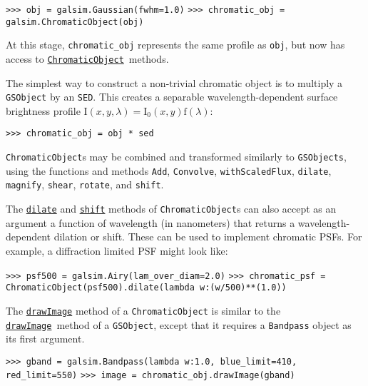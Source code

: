 \documentclass[preprint,10pt]{../../devel/modules/aastex}
\newcommand\ChromaticObject{\href{http://galsim-developers.github.io/GalSim/classgalsim_1_1chromatic_1_1_chromatic_object.html}{\texttt{ChromaticObject}}}
\newcommand\drawImage{\href{http://galsim-developers.github.io/GalSim/classgalsim_1_1base_1_1_g_s_object.html\#aafe6ca9d84fe81543fbc105b897273db}{\texttt{drawImage}}}
\begin{document}
\texttt{>>> obj = galsim.Gaussian(fwhm=1.0)}\newline
\texttt{>>> chromatic\_obj = galsim.ChromaticObject(obj)}

At this stage, \texttt{chromatic\_obj} represents the same profile as \texttt{obj}, but
now has access to \ChromaticObject\ methods.

The simplest way to construct a non-trivial chromatic object is to multiply a \texttt{GSObject} by
an \texttt{SED}.  This creates a separable wavelength-dependent surface brightness profile
$\mathrm{I}(x, y, \lambda) = \mathrm{I}_0(x, y) \mathrm{f}(\lambda)$:

\texttt{>>> chromatic\_obj = obj * sed}

\texttt{ChromaticObject}s may be combined and transformed similarly to
\texttt{GSObjects}, using the functions and methods \texttt{Add}, \texttt{Convolve}, \texttt{withScaledFlux}, \texttt{dilate}, \texttt{magnify}, \texttt{shear}, \texttt{rotate}, and \texttt{shift}.

The \href{http://galsim-developers.github.io/GalSim/classgalsim_1_1chromatic_1_1_chromatic_object.html#adb05a4f0dadc3c7cbc361ec97984e6f1}{\texttt{dilate}} and \href{http://galsim-developers.github.io/GalSim/classgalsim_1_1chromatic_1_1_chromatic_object.html#ab266ee1207d60ba7a9fb6b32a4ef6ab2}{\texttt{shift}} methods of
\texttt{ChromaticObject}s can also accept as an argument a function of wavelength (in nanometers)
that returns a wavelength-dependent dilation or shift.  These can be used to implement
chromatic PSFs.  For example, a diffraction limited PSF might look
like:

\texttt{>>> psf500 = galsim.Airy(lam\_over\_diam=2.0)}\newline
\texttt{>>> chromatic\_psf = ChromaticObject(psf500).dilate(lambda w:(w/500)**(1.0))}

The \href{http://galsim-developers.github.io/GalSim/classgalsim_1_1chromatic_1_1_chromatic_object.html#a4228098295ee04e4f491567a9ce3b28f}{\texttt{drawImage}} method of a \texttt{ChromaticObject} is similar to the \drawImage\ method of a \texttt{GSObject},
except that it requires a \texttt{Bandpass} object as its first
argument.

\texttt{>>> gband = galsim.Bandpass(lambda w:1.0, blue\_limit=410, red\_limit=550)} \newline
\texttt{>>> image = chromatic\_obj.drawImage(gband)}
\end{document}
